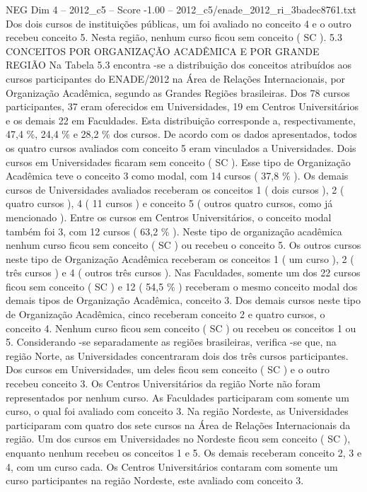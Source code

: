 \begin{textsample}{NEG Dim 4 – 2012\_c5 – Score -1.00 – 2012\_c5/enade\_2012\_ri\_3badec8761.txt}
Dos dois cursos de instituições públicas, um foi avaliado no conceito 4 e o outro recebeu conceito 5.
Nesta região, nenhum curso ficou sem conceito ( SC ). 5.3 CONCEITOS POR ORGANIZAÇÃO ACADÊMICA E POR GRANDE REGIÃO Na Tabela 5.3 encontra -se a distribuição dos conceitos atribuídos aos cursos participantes do ENADE/2012 na Área de Relações Internacionais, por Organização Acadêmica, segundo as Grandes Regiões brasileiras.
Dos 78 cursos participantes, 37 eram oferecidos em Universidades, 19 em Centros Universitários e os demais 22 em Faculdades.
Esta distribuição corresponde a, respectivamente, 47,4 \%, 24,4 \% e 28,2 \% dos cursos.
De acordo com os dados apresentados, todos os quatro cursos avaliados com conceito 5 eram vinculados a Universidades.
Dois cursos em Universidades ficaram sem conceito ( SC ).
Esse tipo de Organização Acadêmica teve o conceito 3 como modal, com 14 cursos ( 37,8 \% ).
Os demais cursos de Universidades avaliados receberam os conceitos 1 ( dois cursos ), 2 ( quatro cursos ), 4 ( 11 cursos ) e conceito 5 ( outros quatro cursos, como já mencionado ).
Entre os cursos em Centros Universitários, o conceito modal também foi 3, com 12 cursos ( 63,2 \% ).
Neste tipo de organização acadêmica nenhum curso ficou sem conceito ( SC ) ou recebeu o conceito 5.
Os outros cursos neste tipo de Organização Acadêmica receberam os conceitos 1 ( um curso ), 2 ( três cursos ) e 4 ( outros três cursos ).
Nas Faculdades, somente um dos 22 cursos ficou sem conceito ( SC ) e 12 ( 54,5 \% ) receberam o mesmo conceito modal dos demais tipos de Organização Acadêmica, conceito 3.
Dos demais cursos neste tipo de Organização Acadêmica, cinco receberam conceito 2 e quatro cursos, o conceito 4.
Nenhum curso ficou sem conceito ( SC ) ou recebeu os conceitos 1 ou 5.
Considerando -se separadamente as regiões brasileiras, verifica -se que, na região Norte, as Universidades concentraram dois dos três cursos participantes.
Dos cursos em Universidades, um deles ficou sem conceito ( SC ) e o outro recebeu conceito 3.
Os Centros Universitários da região Norte não foram representados por nenhum curso.
As Faculdades participaram com somente um curso, o qual foi avaliado com conceito 3.
Na região Nordeste, as Universidades participaram com quatro dos sete cursos na Área de Relações Internacionais da região.
Um dos cursos em Universidades no Nordeste ficou sem conceito ( SC ), enquanto nenhum recebeu os conceitos 1 e 5.
Os demais receberam conceito 2, 3 e 4, com um curso cada.
Os Centros Universitários contaram com somente um curso participantes na região Nordeste, este avaliado com conceito 3.

\end{textsample}

